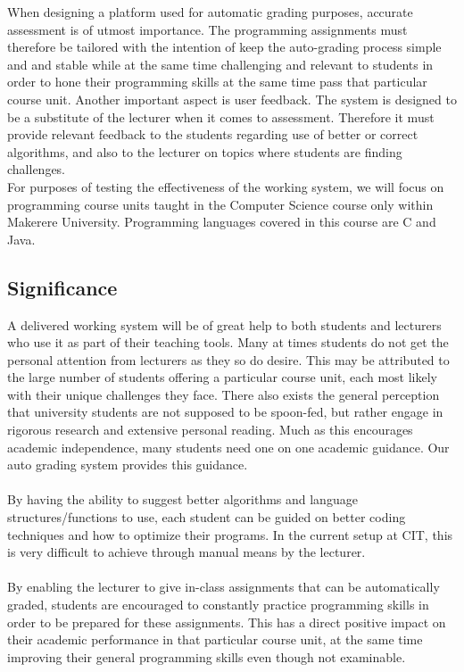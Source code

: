 \documentclass[12pt]{article}
\begin{document}
		When designing a platform used for automatic grading purposes, accurate assessment is of utmost importance. The programming assignments must therefore be tailored with the intention of keep the auto-grading process simple and and stable while at the same time challenging and relevant to students in order to hone their programming skills at the same time pass that particular course unit. Another important aspect is user feedback. The system is designed to be a substitute of the lecturer when it comes to assessment. Therefore it must provide relevant feedback to the students regarding use of better or correct algorithms, and also to the lecturer on topics where students are finding challenges.\\
		
		For purposes of testing the effectiveness of the working system, we will focus on
		programming course units taught in the Computer Science course only within Makerere
		University. Programming languages covered in this course are C and Java.

	\subsection{Significance}
			A delivered working system will be of great help to both students and lecturers who use it
		as part of their teaching tools. Many at times students do not get the personal attention
		from lecturers as they so do desire. This may be attributed to the large number of students
		offering a particular course unit, each most likely with their unique challenges they face.
		There also exists the general perception that university students are not supposed to be
		spoon-fed, but rather engage in rigorous research and extensive personal reading. Much
		as this encourages academic independence, many students need one on one academic
		guidance. Our auto grading system provides this guidance. \\ \\
			By having the ability to suggest better algorithms and language structures/functions to use,
		each student can be guided on better coding techniques and how to optimize their programs. In the current setup at 				CIT, this is very difficult to achieve through manual means by the lecturer. \\ \\
			By enabling the lecturer to give in-class assignments that can be automatically graded,
		students are encouraged to constantly practice programming skills in order to be prepared
		for these assignments. This has a direct positive impact on their academic performance in
		that particular course unit, at the same time improving their general programming skills
		even though not examinable. 
\end{document}
